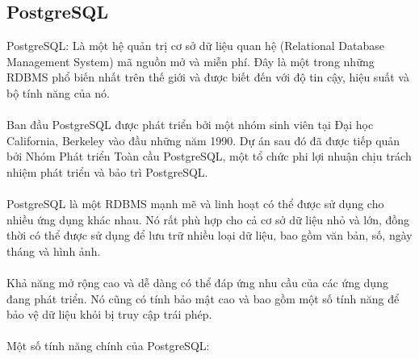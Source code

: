 \subsection{PostgreSQL}
PostgreSQL: Là một hệ quản trị cơ sở dữ liệu quan hệ (Relational Database
Management System) mã nguồn mở và miễn phí. Đây là một trong những RDBMS
phổ biến nhất trên thế giới và được biết đến với độ tin cậy, hiệu suất và bộ tính năng
của nó.\\
\\
Ban đầu PostgreSQL được phát triển bởi một nhóm sinh viên tại Đại học California, Berkeley vào đầu những năm 1990. Dự án sau đó đã được tiếp quản bởi Nhóm Phát triển Toàn cầu PostgreSQL, một tổ chức phi lợi nhuận chịu trách nhiệm phát triển và bảo trì PostgreSQL.\\
\\
PostgreSQL là một RDBMS mạnh mẽ và linh hoạt có thể được sử dụng cho nhiều
ứng dụng khác nhau. Nó rất phù hợp cho cả cơ sở dữ liệu nhỏ và lớn, đồng thời có thể được sử dụng để lưu trữ nhiều loại dữ liệu, bao gồm văn bản, số, ngày tháng và hình ảnh.\\
\\
Khả năng mở rộng cao và dễ dàng có thể đáp ứng nhu cầu của các ứng dụng đang phát triển. Nó cũng có tính bảo mật cao và bao gồm một số tính năng để bảo vệ dữ liệu khỏi bị truy cập trái phép.\\
\\
Một số tính năng chính của PostgreSQL:
